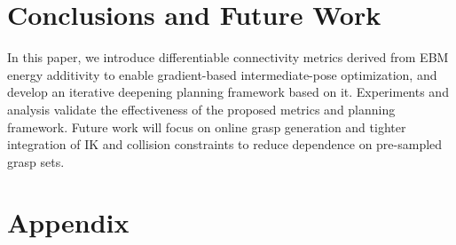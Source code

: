 \documentclass[journal, twoside]{IEEEtran}
\newif\ifshownotes
\newcommand{\lqin}[1]{\ifshownotes{\color{darkgreen}\begin{CJK*}{UTF8}{gkai}\small#1\end{CJK*}}\fi}
\begin{document}
\lqin{The results demonstrate that iterative deepening effectively restores solvability by adaptively increasing sequence length when needed. The gap between S.P. and S.VG. reflects the calibration of the energy threshold $h$: Bottle shows S.VG. $>$ S.P., indicating conservative filtering, while Pentagon shows S.P. $>$ S.VG., suggesting permissive acceptance. Compared to the Bunny and Pentagon results in table~\ref{tab_one_step_exp}, multi-step planning provides a higher success rate. Bunny and Pentagon also achieve significantly higher success rates (94\% and 90-92\%) compared to Bottle (42-44\%) and Mug (10\%), and less sequence length, which may correlate with their shape-related number of stable placements (7 each vs. 5 and 2) that provide better connectivity options. The minimal performance difference between $K_{\mathrm{top}}$=10 and $K_{\mathrm{top}}$=50 indicates that feasible solutions concentrate in the low-energy region, validating the effectiveness of the energy-based cost formulation.}

\section{Conclusions and Future Work}
In this paper, we introduce differentiable connectivity metrics derived from EBM energy additivity to enable gradient-based intermediate-pose optimization, and develop an iterative deepening planning framework based on it. Experiments and analysis validate the effectiveness of the proposed metrics and planning framework. Future work will focus on online grasp generation and tighter integration of IK and collision constraints to reduce dependence on pre-sampled grasp sets.

\normalem



\section*{Appendix}
\label{Appendix_I}
\end{document}
